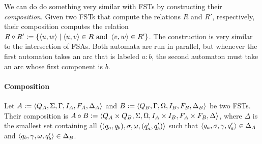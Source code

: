 We can do do something very similar with FSTs by constructing their \emph{composition}.
Given two FSTs that compute the relations $R$ and $R'$, respectively, their composition computes the relation $R \circ R' \mathrel{\mathop:}= \left \{ \left \langle u,w \right \rangle  \mid \left \langle u,v \right \rangle  \in R \text{ and } \left \langle v,w \right \rangle  \in R' \right \}$.
The construction is very similar to the intersection of FSAs.
Both automata are run in parallel, but whenever the first automaton takes an arc that is labeled $a:b$, the second automaton must take an arc whose first component is $b$.

\paragraph{Composition}
Let $A \mathrel{\mathop:}= \left \langle Q_A, \Sigma, \Gamma, I_A, F_A, \Delta_A \right \rangle $ and $B \mathrel{\mathop:}= \left \langle Q_B, \Gamma, \Omega, I_B, F_B, \Delta_B \right \rangle $ be two FSTs.
Their composition is $A \circ B \mathrel{\mathop:}= \left \langle Q_A \times Q_B, \Sigma, \Omega, I_A \times I_B, F_A \times F_B, \Delta \right \rangle $, where $\Delta$ is the smallest set containing all $\left \langle (q_a,q_b),\sigma,\omega,(q_a',q_b') \right \rangle $ such that $\left \langle q_a,\sigma,\gamma,q_a' \right \rangle  \in \Delta_A$ and $\left \langle q_b,\gamma,\omega,q_b' \right \rangle  \in \Delta_B$.


